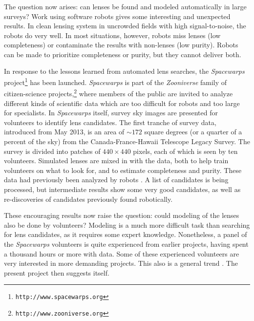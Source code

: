 \documentclass[12pt,preprint]{aastex}
\begin{document}
The question now arises: can lenses be found and modeled
automatically in large surveys?  Work using software robots
\citep{2009ApJ...694..924M} gives some interesting and unexpected
results.  In clean lensing system in uncrowded fields with high
signal-to-noise, the robots do very well.  In most situations,
however, robots miss lenses (low completeness) or contaminate the
results with non-lenses (low purity).  Robots can be made to
prioritize completeness or purity, but they cannot deliver both.

In response to the lessons learned from automated lens searches, the
{\em Spacewarps\/} project\footnote{\tt http://www.spacewarps.org}
 has been launched.  {\em Spacewarps\/} is
part of the {\em Zooniverse\/} family of citizen-science
projects,\footnote{\tt http://www.zooniverse.org} where members of the
public are invited to analyze different kinds of scientific data which
are too difficult for robots and too large for specialists.  In {\em
 Spacewarps\/} itself, survey sky images are presented for volunteers to identify lens candidates.  The first tranche of survey data, introduced from May 2013, is an area of $\sim172$ square
degrees (or a quarter of a percent of the sky) from the Canada-France-Hawaii Telescope Legacy Survey.
 The survey is divided into patches of $440\times 440$ pixels, each of
which is seen by ten volunteers.  Simulated lenses are mixed in with
the data, both to help train volunteers on what to look for, and to
estimate completeness and purity.
These data had previously been analyzed by robots \cite{Gavazzi2012, More2012ApJ}.  
  A list of candidates is being
processed, but intermediate results show some very good candidates, as
well as re-discoveries of candidates previously found robotically.

These encouraging results now raise the question: could modeling of
the lenses also be done by volunteers?  Modeling is a much more
difficult task than searching for lens candidates, as it requires some
expert knowledge.  Nonetheless, a panel of the {\em Spacewarps\/}
volunteers is quite experienced from earlier projects, having spent a
thousand hours or more with data.  Some of these experienced
volunteers are very interested in more demanding projects.  This also
is a general trend \citep[cf.][]{Khatib22112011}.  The present project
then suggests itself.
\end{document}
